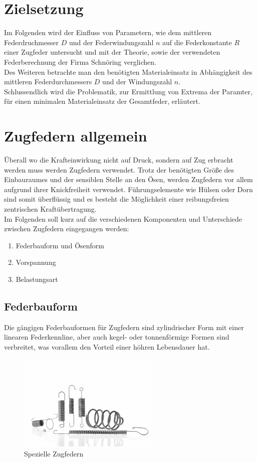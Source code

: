 \newpage
\section*{Zielsetzung}
Im Folgenden wird der Einfluss von Parametern, wie dem mittleren Federdruchmesser $D$
und der Federwindungszahl $n$ auf die Federkonstante $R$ einer Zugfeder untersucht
und mit der Theorie, sowie der verwendeten Federberechnung der Firma Schnöring verglichen.\\

Des Weiteren betrachte man den benötigten Materialeinsatz in Abhängigkeit des mittleren Federdurchmessers $D$ und 
der Windungszahl $n$.\\
Schlussendlich wird die Problematik, zur Ermittlung von Extrema der Paramter, für einen
minimalen Materialeinsatz der Gesamtfeder, erläutert.
 

\section{Zugfedern allgemein}
Überall wo die Krafteinwirkung nicht auf Druck, sondern auf Zug erbracht werden muss
werden Zugfedern verwendet. Trotz der benötigten Größe des Einbauraumes und der sensiblen
Stelle an den Ösen, werden Zugfedern vor allem aufgrund ihrer Knickfreiheit verwendet.
Führungselemente wie Hülsen oder Dorn sind somit überflüssig und es besteht die Möglichkeit
einer reibungsfreien zentrischen Kraftübertragung.\\
Im Folgenden soll kurz auf die verschiedenen Komponenten und Unterschiede zwischen
Zugfedern eingegangen werden:
\begin{enumerate}
    \item Federbauform und Ösenform
    \item Vorspannung
    \item Belastungsart
\end{enumerate}



\subsection{Federbauform}
Die gängigen Federbauformen für Zugfedern sind zylindrischer Form mit einer linearen
Federkennline, aber auch kegel- oder tonnenförmige Formen sind verbreitet, was vorallem
den Vorteil einer höhren Lebensdauer hat.
\begin{figure}[H]
    \centering
    \includegraphics[width=0.6\textwidth]{bilder/Input/zugfedern_spezial.jpg}
    \caption{Spezielle Zugfedern \cite{KompZ}}
\end{figure}



